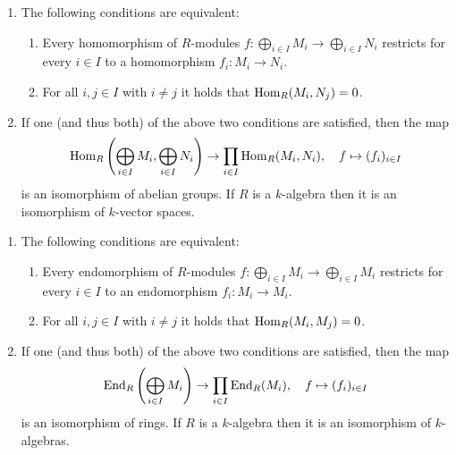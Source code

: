 \begin{proposition}
  \leavevmode
  \begin{enumerate}
    \item
      The following conditions are equivalent:
      \begin{enumerate}
        \item
          Every homomorphism of $R$-modules $f \colon \bigoplus_{i \in I} M_i \to \bigoplus_{i \in I} N_i$ restricts for every $i \in I$ to a homomorphism $f_i \colon M_i \to N_i$.
        \item
          For all $i, j \in I$ with $i \neq j$ it holds that $\operatorname{Hom}_R(M_i, N_j) = 0$.
      \end{enumerate}
    \item
      If one (and thus both) of the above two conditions are satisfied, then the map
      \[
                \operatorname{Hom}_R\left( \bigoplus_{i \in I} M_i, \bigoplus_{i \in I} N_i \right)
        \to     \prod_{i \in I} \operatorname{Hom}_R(M_i, N_i),
        \quad   f
        \mapsto (f_i)_{i \in I}
      \]
      is an isomorphism of abelian groups.
      If $R$ is a $k$-algebra then it is an isomorphism of $k$-vector spaces.
  \end{enumerate}
\end{proposition}


\begin{corollary}
  \label{corollary: decomposition of endomorphism ring into product}
  \leavevmode
  \begin{enumerate}
    \item
      The following conditions are equivalent:
      \begin{enumerate}
        \item
          Every endomorphism of $R$-modules $f \colon \bigoplus_{i \in I} M_i \to \bigoplus_{i \in I} M_i$ restricts for every $i \in I$ to an endomorphism $f_i \colon M_i \to M_i$.
        \item
          For all $i, j \in I$ with $i \neq j$ it holds that $\operatorname{Hom}_R(M_i, M_j) = 0$.
      \end{enumerate}
    \item
      If one (and thus both) of the above two conditions are satisfied, then the map
      \[
                \operatorname{End}_R\left( \bigoplus_{i \in I} M_i \right)
        \to     \prod_{i \in I} \operatorname{End}_R(M_i),
        \quad   f
        \mapsto (f_i)_{i \in I}
      \]
      is an isomorphism of rings.
      If $R$ is a $k$-algebra then it is an isomorphism of $k$-algebras.
  \end{enumerate}
\end{corollary}


